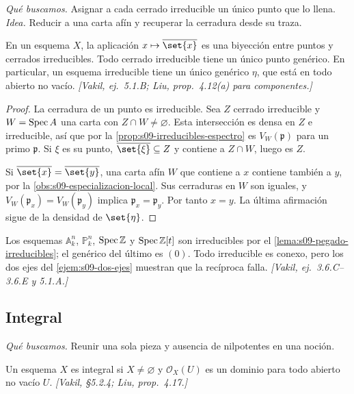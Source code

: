 \emph{Qué buscamos.} Asignar a cada cerrado irreducible un único punto que lo llena. \emph{Idea.} Reducir a una carta afín y recuperar la cerradura desde su traza.

\begin{prop}
\label{prop:s09-puntos-genericos}
En un esquema $X$, la aplicación $x\mapsto\overline{\set{x}}$ es una biyección entre puntos y cerrados irreducibles. Todo cerrado irreducible tiene un único punto genérico. En particular, un esquema irreducible tiene un único genérico $\eta$, que está en todo abierto no vacío. \emph{[Vakil, ej.~5.1.B; Liu, prop.~4.12(a) para componentes.]}
\end{prop}
\begin{proof}
La cerradura de un punto es irreducible. Sea $Z$ cerrado irreducible y $W=\operatorname{Spec} A$ una carta con $Z\cap W\ne\varnothing$. Esta intersección es densa en $Z$ e irreducible, así que por la \cref{prop:s09-irreducibles-espectro} es $V_W(\mathfrak p)$ para un primo $\mathfrak p$. Si $\xi$ es su punto, $\overline{\set{\xi}}\subseteq Z$ y contiene a $Z\cap W$, luego es $Z$.

Si $\overline{\set{x}}=\overline{\set{y}}$, una carta afín $W$ que contiene a $x$ contiene también a $y$, por la \cref{obs:s09-especializacion-local}. Sus cerraduras en $W$ son iguales, y $V_W(\mathfrak p_x)=V_W(\mathfrak p_y)$ implica $\mathfrak p_x=\mathfrak p_y$. Por tanto $x=y$. La última afirmación sigue de la densidad de $\set{\eta}$.
\end{proof}

\begin{ejem}
\label{ejem:s09-irreducibles-conocidos}
Los esquemas $\mathbb A^n_k$, $\mathbb P^n_k$, $\operatorname{Spec}\mathbb Z$ y $\operatorname{Spec}\mathbb Z[t]$ son irreducibles por el \cref{lema:s09-pegado-irreducibles}; el genérico del último es $(0)$. Todo irreducible es conexo, pero los dos ejes del \cref{ejem:s09-dos-ejes} muestran que la recíproca falla. \emph{[Vakil, ej.~3.6.C--3.6.E y 5.1.A.]}
\end{ejem}

\subsection{Integral}
\emph{Qué buscamos.} Reunir una sola pieza y ausencia de nilpotentes en una noción.

\begin{defi}
\label{defi:s09-esquema-integral}
Un esquema $X$ es integral si $X\ne\varnothing$ y $\mathcal O_X(U)$ es un dominio para todo abierto no vacío $U$. \emph{[Vakil, \S5.2.4; Liu, prop.~4.17.]}
\end{defi}

